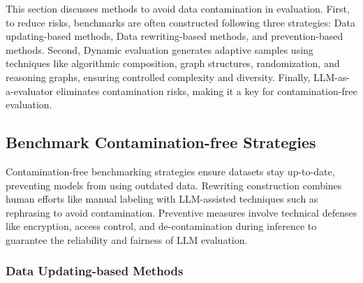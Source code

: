 \label{sec:where}
This section discusses methods to avoid data contamination in evaluation. First, to reduce risks, benchmarks are often constructed following three strategies: Data updating-based methods, Data rewriting-based methods, and prevention-based methods. Second, Dynamic evaluation generates adaptive samples using techniques like algorithmic composition, graph structures, randomization, and reasoning graphs, ensuring controlled complexity and diversity. Finally, LLM-as-a-evaluator eliminates contamination risks, making it a key for contamination-free evaluation.

\subsection{Benchmark Contamination-free Strategies}

Contamination-free benchmarking strategies ensure datasets stay up-to-date, preventing models from using outdated data. Rewriting construction combines human efforts like manual labeling with LLM-assisted techniques such as rephrasing to avoid contamination. Preventive measures involve technical defenses like encryption, access control, and de-contamination during inference to guarantee the reliability and fairness of LLM evaluation.

\subsubsection{Data Updating-based Methods}

